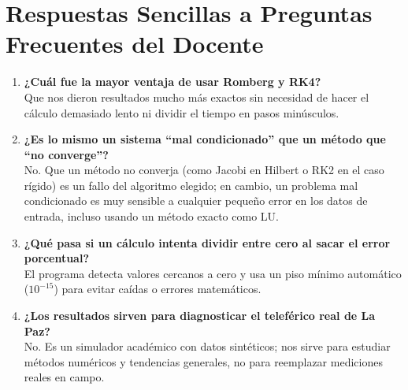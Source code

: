 \documentclass[11pt,a4paper]{article}
\begin{document}
\section{Respuestas Sencillas a Preguntas Frecuentes del Docente}
\begin{enumerate}[noitemsep]
    \item \textbf{¿Cuál fue la mayor ventaja de usar Romberg y RK4?}\\
    Que nos dieron resultados mucho más exactos sin necesidad de hacer el cálculo demasiado lento ni dividir el tiempo en pasos minúsculos.
    \item \textbf{¿Es lo mismo un sistema ``mal condicionado'' que un método que ``no converge''?}\\
    No. Que un método no converja (como Jacobi en Hilbert o RK2 en el caso rígido) es un fallo del algoritmo elegido; en cambio, un problema mal condicionado es muy sensible a cualquier pequeño error en los datos de entrada, incluso usando un método exacto como LU.
    \item \textbf{¿Qué pasa si un cálculo intenta dividir entre cero al sacar el error porcentual?}\\
    El programa detecta valores cercanos a cero y usa un piso mínimo automático ($10^{-15}$) para evitar caídas o errores matemáticos.
    \item \textbf{¿Los resultados sirven para diagnosticar el teleférico real de La Paz?}\\
    No. Es un simulador académico con datos sintéticos; nos sirve para estudiar métodos numéricos y tendencias generales, no para reemplazar mediciones reales en campo.
\end{enumerate}
\end{document}
